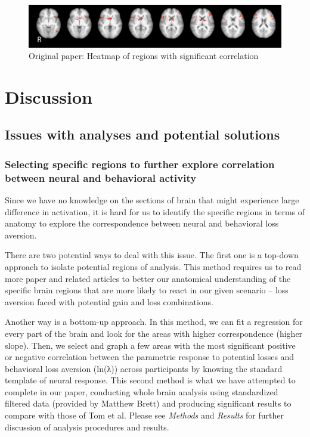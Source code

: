 \documentclass[11pt]{article}
\begin{document}
\begin{figure}[H]
    \centering
        \includegraphics[scale=0.5]{figures/Regression3/Orig_sig_cor_z_neural_aversion.png}
    \caption{Original paper: Heatmap of regions with significant correlation}
\end{figure}

\newpage


\section{Discussion}

\subsection{Issues with analyses and potential solutions}

\subsubsection{Selecting specific regions to further explore 
correlation between neural and behavioral activity}

\indent Since we have no knowledge on the sections of brain that might 
experience large difference in activation, it is hard for us to identify the 
specific regions in terms of anatomy to explore the correspondence between neural 
and behavioral loss aversion.

There are two potential ways to deal with this issue. The first one is a 
top-down approach to isolate potential regions of analysis. This method 
requires us to read more paper and related articles to better our anatomical 
understanding of the specific brain regions that are more likely to react in our 
given scenario -- loss aversion faced with potential gain and loss combinations.

Another way is a bottom-up approach. In this method, we can fit a regression for 
every part of the brain and look for the areas with higher correspondence 
(higher slope). Then, we select and graph a few areas with the most significant 
positive or negative correlation between the parametric response to potential 
losses and behavioral loss aversion (ln(λ)) across participants by knowing the 
standard template of neural response. This second method is what we have attempted 
to complete in our paper, conducting whole brain analysis using standardized 
filtered data (provided by Matthew Brett) and producing significant results to 
compare with those of Tom et al. Please see \textit{Methods} and \textit{Results} 
for further discussion of analysis procedures and results. 
\end{document}
